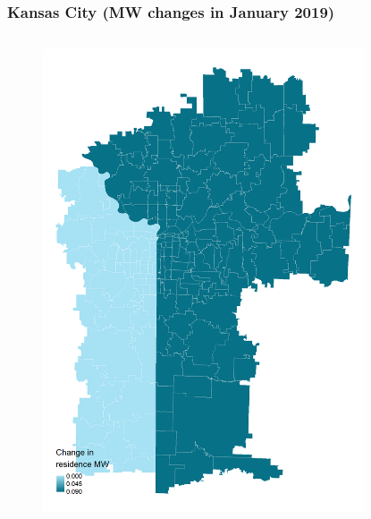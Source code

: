 \documentclass[aspectratio=169, t]{beamer}
\begin{document}
\begin{frame}[label = kc_example]
\frametitle{Kansas City (MW changes in January 2019)}
    \begin{columns}
        \begin{column}{0.50\textwidth}
            \vspace{-4mm}
            \begin{figure}
                \centering
                \includegraphics[scale = 0.36]{maps_events/output/kc_2018-12_statutory_mw.png}
            \end{figure}   
        \end{column}
        \begin{column}{0.50\textwidth}
            \vspace{-4mm}
            \begin{figure}
                \centering

\end{figure}
\end{column}
\end{columns}
\end{frame}
\end{document}
